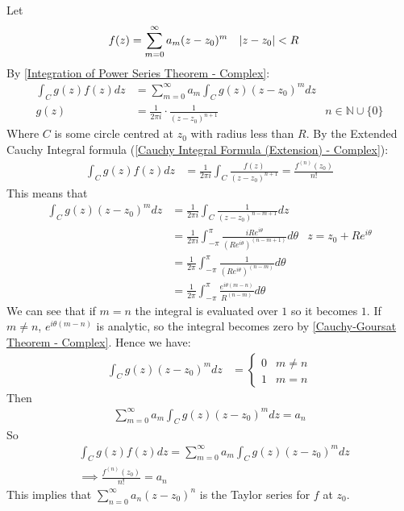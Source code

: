 \documentclass[12pt, english]{book}
\makeatletter
\renewenvironment{proof}[1][\proofname]{\par
	\pushQED{\qed}%
	\normalfont \topsep6\p@\@plus6\p@\relax
	\list{}{%
		\settowidth{\leftmargin}{\itshape\proofname:\hskip\labelsep}%
		\setlength{\labelwidth}{0pt}%
		\setlength{\itemindent}{-\leftmargin}%
	}%
	\item[\hskip\labelsep\itshape#1\@addpunct{:}]\ignorespaces
	}{ \popQED\endlist\@endpefalse}
\makeatother
\begin{document}
	\begin{proof}
		Let 
		\begin{align*}
			f(z) &= \sum_{m=0}^{\infty} a_m (z-z_0)^m & \abs{z-z_0} &< R
		\end{align*}
		By \cref{Integration of Power Series Theorem - Complex}:
		\begin{align*}
			\int_{C} g(z) f(z) dz &= \sum_{m=0}^{\infty} a_m \int_{C} g(z) (z-z_0)^m dz \\
			 g(z) &= \frac{1}{2\pi i} \cdot \frac{1}{(z-z_0)^{n+1}} & n \in \mathbb{N} \cup \{0\}
		\end{align*}
		Where \(C\) is some circle centred at \(z_0\) with radius less than \(R\).
		By the Extended Cauchy Integral formula (\cref{Cauchy Integral Formula (Extension) - Complex}):
		\begin{align*}
			\int_{C} g(z) f(z) dz &= \frac{1}{2\pi i} \int_{C} \frac{f(z)}{(z-z_0)^{n+1}} = \frac{f^{(n)}(z_0)}{n!}
		\end{align*}
		This means that 
		\begin{align*}
			\int_{C} g(z) (z-z_0)^m dz 
			&= \frac{1}{2\pi i} \int_{C} \frac{1}{(z-z_0)^{n-m+1}} dz \\
			&= \frac{1}{2\pi i} \int_{-\pi}^{\pi} \frac{iRe^{i\theta}}{(Re^{i\theta})^{(n-m+1)}} d\theta 
				& z = z_0 + Re^{i\theta} \\
			&= \frac{1}{2\pi} \int_{-\pi}^{\pi} \frac{1}{(Re^{i\theta})^{(n-m)}} d\theta \\
			&= \frac{1}{2\pi} \int_{-\pi}^{\pi} \frac{e^{i\theta(m-n)}}{R^{(n-m)}} d\theta 
		\end{align*}
		We can see that if \(m=n\) the integral is evaluated over \(1\) so it becomes \(1\). If \(m\neq n\), \(e^{i\theta(m-n)}\) is analytic, so the integral becomes zero by \cref{Cauchy-Goursat Theorem - Complex}. Hence we have:
		\begin{align*}
			\int_{C} g(z) (z-z_0)^m dz 
			&= \begin{cases}
				0 & m\neq n\\
				1 & m=n
			\end{cases}
		\end{align*}
		Then 
		\begin{align*}
			\sum_{m=0}^{\infty} a_m \int_{C} g(z)(z-z_0)^m dz = a_n
		\end{align*}
		So 
		\begin{align*}
			&\int_{C} g(z) f(z) dz = \sum_{m=0}^{\infty} a_m \int_{C} g(z) (z-z_0)^m dz \\
			&\implies \frac{f^{(n)}(z_0)}{n!} = a_n
		\end{align*}
		This implies that \( \sum_{n=0}^{\infty} a_n (z-z_0)^n \) is the Taylor series for \(f\) at \(z_0\).
	\end{proof}
\end{document}
